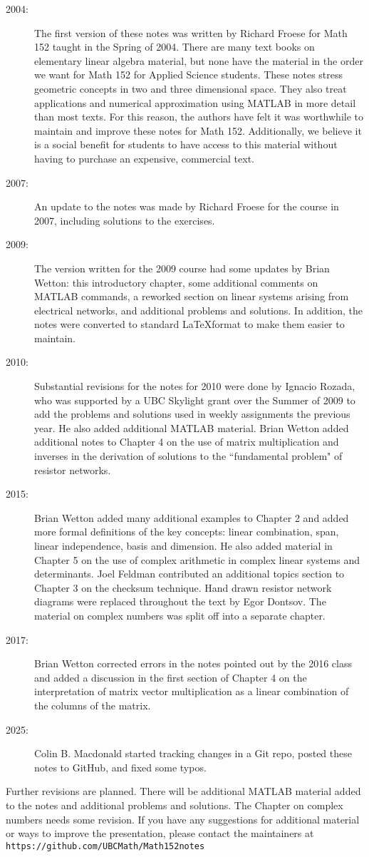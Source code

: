 \begin{description}
\item[2004:] 
The first version of these notes was written by Richard Froese for
Math 152 taught in the Spring of 2004. There are many text books on
elementary linear algebra material, but none have the material in the
order we want for Math 152 for Applied Science students. These notes
stress geometric concepts in two and three dimensional space. They
also treat applications and numerical approximation using MATLAB in
more detail than most texts. For this reason, the authors have felt it
was worthwhile to maintain and improve these notes for Math
152. Additionally, we believe it is a social benefit for students to
have access to this material without having to purchase an expensive,
commercial text.
\item[2007:] 
An update to the notes was made by Richard Froese for the course in
2007, including solutions to the exercises. 
\item[2009:] The version written for
the 2009 course had some updates by Brian Wetton: this introductory
chapter, some additional comments on MATLAB commands, a reworked
section on linear systems arising from electrical networks, and
additional problems and solutions. In addition, the notes were 
converted to standard \LaTeX format to make them easier to maintain. 
\item[2010:] 
Substantial revisions for the notes for 2010 were done by Ignacio Rozada, who was supported 
by a UBC Skylight grant over the Summer of 2009 to add the problems 
and solutions used in weekly assignments the previous year. He also 
added additional MATLAB material. Brian Wetton added additional notes 
to Chapter 4 on the use of matrix multiplication and inverses in the 
derivation of solutions to the ``fundamental problem" of resistor 
networks.
\item[2015:] Brian Wetton added many additional examples to Chapter 2 and added more formal 
definitions of the key concepts: linear combination, span, linear independence, basis and dimension. He also added material in Chapter 5 on the use of complex arithmetic in complex linear systems and determinants. 
Joel Feldman contributed an additional topics section to Chapter 3 on the checksum technique. 
Hand drawn resistor network diagrams were replaced throughout the text by Egor Dontsov. The material on 
complex numbers was split off into a separate chapter.
\item[2017:] Brian Wetton corrected errors in the notes pointed out by the 2016 class and added a discussion in the first section of Chapter 4 on the interpretation of matrix vector multiplication as a linear combination of the columns of the matrix.
\item[2025:] Colin B. Macdonald started tracking changes in a Git repo,
posted these notes to GitHub, and fixed some typos.
\end{description} 
Further revisions are planned. There will be additional MATLAB
material added to the notes and additional problems and solutions. The Chapter on complex numbers needs some revision.
If you have any suggestions for additional
material or ways to improve the presentation, please contact the maintainers
at
{\tt https://github.com/UBCMath/Math152notes}


% 
